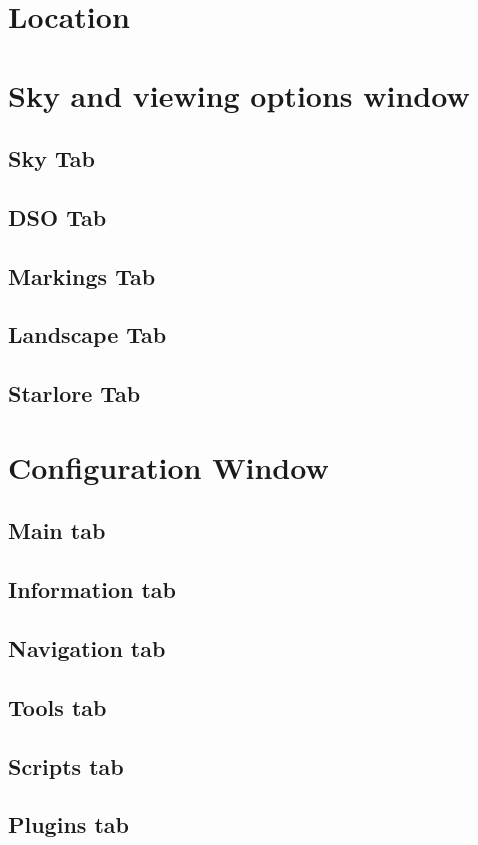\section{Location}


\section{Sky and viewing options window}
\subsection{Sky Tab}
\subsection{DSO Tab}
\subsection{Markings Tab}
\subsection{Landscape Tab}
\subsection{Starlore Tab}

\section{Configuration Window}
\subsection{Main tab}
\subsection{Information tab}
\subsection{Navigation tab}
\subsection{Tools tab}
\subsection{Scripts tab}
\subsection{Plugins tab}

